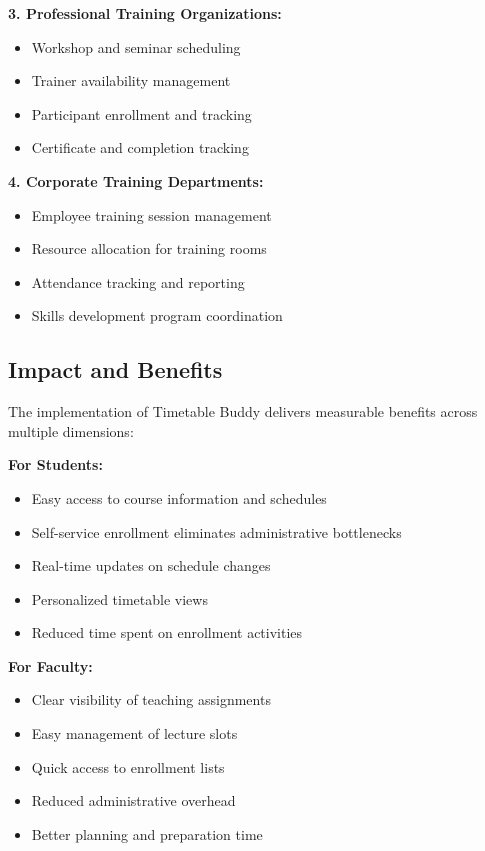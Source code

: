\textbf{3. Professional Training Organizations:}
\begin{itemize}
    \item Workshop and seminar scheduling
    \item Trainer availability management
    \item Participant enrollment and tracking
    \item Certificate and completion tracking
\end{itemize}

\textbf{4. Corporate Training Departments:}
\begin{itemize}
    \item Employee training session management
    \item Resource allocation for training rooms
    \item Attendance tracking and reporting
    \item Skills development program coordination
\end{itemize}

\subsection{Impact and Benefits}

The implementation of Timetable Buddy delivers measurable benefits across multiple dimensions:

\textbf{For Students:}
\begin{itemize}
    \item Easy access to course information and schedules
    \item Self-service enrollment eliminates administrative bottlenecks
    \item Real-time updates on schedule changes
    \item Personalized timetable views
    \item Reduced time spent on enrollment activities
\end{itemize}

\textbf{For Faculty:}
\begin{itemize}
    \item Clear visibility of teaching assignments
    \item Easy management of lecture slots
    \item Quick access to enrollment lists
    \item Reduced administrative overhead
    \item Better planning and preparation time
\end{itemize}

